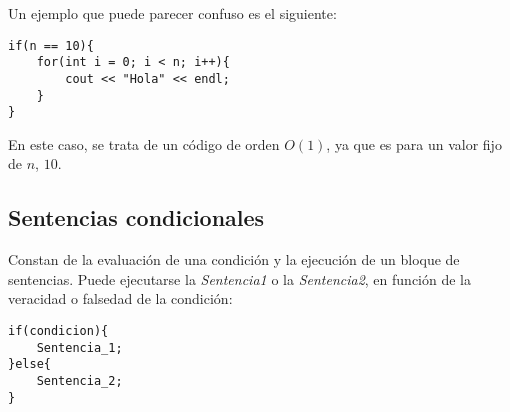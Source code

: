 \begin{ejemplo}
Un ejemplo que puede parecer confuso es el siguiente:
\begin{listing}[H]
    \begin{verbatim}
if(n == 10){
    for(int i = 0; i < n; i++){
        cout << "Hola" << endl;
    }
}
    \end{verbatim}
\end{listing}
En este caso, se trata de un código de orden $O(1)$, ya que es para un valor fijo de $n$, $10$. 
\end{ejemplo}

\subsection{Sentencias condicionales}
Constan de la evaluación de una condición y la ejecución de un bloque de sentencias. Puede ejecutarse la \emph{Sentencia1} o la \emph{Sentencia2}, en función de la veracidad o falsedad de la condición:

\begin{listing}[H]
    \begin{verbatim}
if(condicion){
    Sentencia_1;
}else{
    Sentencia_2;
}
    \end{verbatim}
\end{listing}

